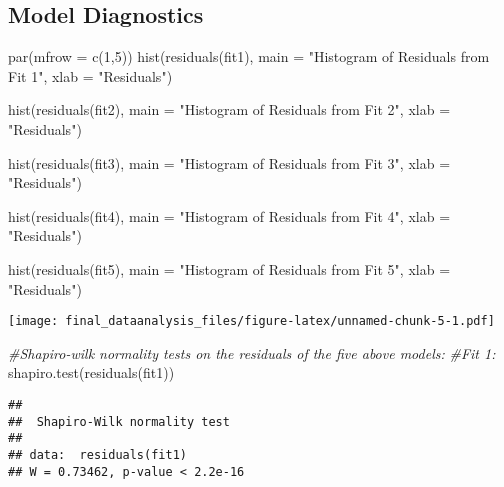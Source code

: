 \documentclass[
]{article}
\newenvironment{Shaded}{\begin{snugshade}}{\end{snugshade}}
\newcommand{\AttributeTok}[1]{\textcolor[rgb]{0.77,0.63,0.00}{#1}}
\newcommand{\CommentTok}[1]{\textcolor[rgb]{0.56,0.35,0.01}{\textit{#1}}}
\newcommand{\DecValTok}[1]{\textcolor[rgb]{0.00,0.00,0.81}{#1}}
\newcommand{\FunctionTok}[1]{\textcolor[rgb]{0.00,0.00,0.00}{#1}}
\newcommand{\NormalTok}[1]{#1}
\newcommand{\StringTok}[1]{\textcolor[rgb]{0.31,0.60,0.02}{#1}}
\begin{document}
\hypertarget{model-diagnostics}{%
\subsection{Model Diagnostics}\label{model-diagnostics}}

\begin{Shaded}
\begin{Highlighting}[]
\FunctionTok{par}\NormalTok{(}\AttributeTok{mfrow =} \FunctionTok{c}\NormalTok{(}\DecValTok{1}\NormalTok{,}\DecValTok{5}\NormalTok{))}
\FunctionTok{hist}\NormalTok{(}\FunctionTok{residuals}\NormalTok{(fit1),}
     \AttributeTok{main =} \StringTok{"Histogram of Residuals from Fit 1"}\NormalTok{,}
     \AttributeTok{xlab =} \StringTok{"Residuals"}\NormalTok{)}

\FunctionTok{hist}\NormalTok{(}\FunctionTok{residuals}\NormalTok{(fit2),}
     \AttributeTok{main =} \StringTok{"Histogram of Residuals from Fit 2"}\NormalTok{,}
     \AttributeTok{xlab =} \StringTok{"Residuals"}\NormalTok{)}

\FunctionTok{hist}\NormalTok{(}\FunctionTok{residuals}\NormalTok{(fit3),}
     \AttributeTok{main =} \StringTok{"Histogram of Residuals from Fit 3"}\NormalTok{,}
     \AttributeTok{xlab =} \StringTok{"Residuals"}\NormalTok{)}

\FunctionTok{hist}\NormalTok{(}\FunctionTok{residuals}\NormalTok{(fit4),}
     \AttributeTok{main =} \StringTok{"Histogram of Residuals from Fit 4"}\NormalTok{,}
     \AttributeTok{xlab =} \StringTok{"Residuals"}\NormalTok{)}

\FunctionTok{hist}\NormalTok{(}\FunctionTok{residuals}\NormalTok{(fit5),}
     \AttributeTok{main =} \StringTok{"Histogram of Residuals from Fit 5"}\NormalTok{,}
     \AttributeTok{xlab =} \StringTok{"Residuals"}\NormalTok{)}
\end{Highlighting}
\end{Shaded}

\texttt{[image: final\_dataanalysis\_files/figure-latex/unnamed-chunk-5-1.pdf]}

\begin{Shaded}
\begin{Highlighting}[]
\CommentTok{\#Shapiro{-}wilk normality tests on the residuals of the five above models:}
\CommentTok{\#Fit 1:}
\FunctionTok{shapiro.test}\NormalTok{(}\FunctionTok{residuals}\NormalTok{(fit1))}
\end{Highlighting}
\end{Shaded}

\begin{verbatim}
## 
##  Shapiro-Wilk normality test
## 
## data:  residuals(fit1)
## W = 0.73462, p-value < 2.2e-16
\end{verbatim}
\end{document}
